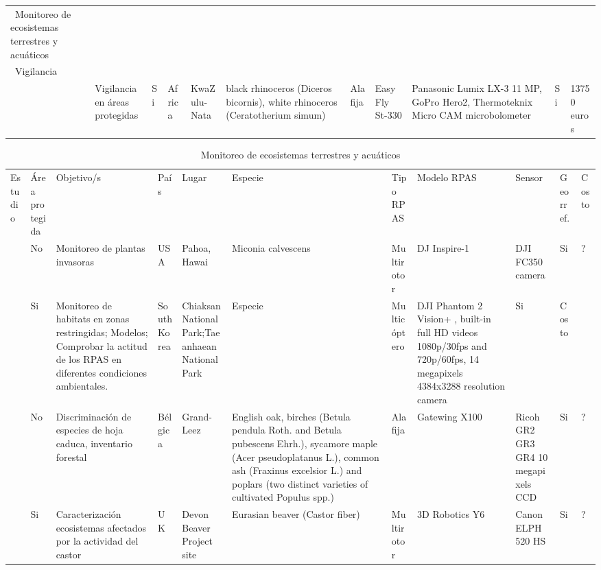 \documentclass[11pt,]{article}
\begin{document}
\begin{sidewaystable}
\begin{tabular}{p{2.5cm}p{1cm}p{3cm}p{1cm}p{2cm}p{2cm}p{1cm}p{2cm}p{2cm}p{1cm}p{0.5cm}}
\ Monitoreo de ecosistemas terrestres y acuáticos \\ 


\ Vigilancia \\ 

\cite{Mulero-Pazmany2014}  & Vigilancia en áreas protegidas & Si & Africa & KwaZulu-Nata & black rhinoceros
(Diceros bicornis), white rhinoceros (Ceratotherium simum)  & Ala fija  & Easy Fly St-330 & Panasonic Lumix LX-3 11 MP, GoPro Hero2, Thermoteknix Micro CAM microbolometer & Si & 13750 euros  \\ 


\end{tabular}
\end{sidewaystable}

\begin{sidewaystable}
\centering
\captionsetup{font=scriptsize,labelfont=scriptsize}
\caption{Monitoreo de ecosistemas terrestres y acuáticos}
\label{my-label}
\tiny
\begin{tabular}{p{2.5cm}p{1cm}p{3cm}p{1cm}p{2cm}p{2cm}p{1cm}p{2cm}p{2cm}p{1cm}p{0.5cm}}
\cmidrule(r){1-11}

Estudio & Área protegida & Objetivo/s & País & Lugar & Especie & Tipo RPAS & Modelo RPAS & Sensor & Georref. & Costo \\ \cmidrule(r){1-11}

\cite{Perroy2017}  & No & Monitoreo de plantas invasoras & USA & Pahoa, Hawai & Miconia calvescens & Multirotor & DJ Inspire-1 & DJI FC350 camera  & Si & ?  \\ 

\cite{Ivosevic2015}  & Si & Monitoreo de habitats en zonas restringidas; Modelos; Comprobar la actitud de los RPAS en diferentes condiciones ambientales. & South Korea & Chiaksan National Park;Taeanhaean National Park &  Especie & Multicóptero & DJI Phantom 2 Vision+ , built-in full HD videos  1080p/30fps and 720p/60fps, 14 megapixels 4384x3288 resolution camera & Si & Costo \\ 


\cite{Lisein2015}  & No & Discriminación de especies de  hoja caduca, inventario forestal & Bélgica & Grand-Leez & English oak, birches (Betula pendula Roth. and Betula pubescens Ehrh.), sycamore maple (Acer pseudoplatanus L.), common ash (Fraxinus excelsior L.) and poplars (two distinct varieties of cultivated Populus spp.) & Ala fija & Gatewing X100  & Ricoh GR2 GR3 GR4 10 megapixels CCD  & Si & ?  \\ 

\cite{Puttock2015}  & Si & Caracterización ecosistemas afectados por la actividad del castor & UK & Devon Beaver Project site & Eurasian beaver (Castor fiber) & Multirotor & 3D Robotics Y6 & Canon ELPH 520 HS  & Si & ?  \\ 


\end{tabular}
\end{sidewaystable}
\end{document}
